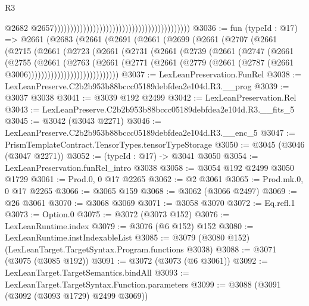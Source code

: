 \begin{lexlean}{R3}
\begin{coremodule}
                                                                                        @2682
                                                                                        @2657))))))))))))))))))))))))))))))))))))))))))
@3036 := fun (typeId : @17) =>
  @2661
    (@2683
      (@2661
        (@2691
          (@2661
            (@2699
              (@2661
                (@2707
                  (@2661
                    (@2715
                      (@2661
                        (@2723
                          (@2661
                            (@2731
                              (@2661
                                (@2739
                                  (@2661
                                    (@2747
                                      (@2661
                                        (@2755
                                          (@2661
                                            (@2763
                                              (@2661
                                                (@2771
                                                  (@2661
                                                    (@2779
                                                      (@2661
                                                        (@2787
                                                          (@2661 @3006))))))))))))))))))))))))))))
@3037 := LexLeanPreservation.FunRel
@3038 := LexLeanPreserve.C2b2b953b88bccc05189debfdea2e104d.R3.__prog
@3039 := @3037 @3038
@3041 := @3039 @192 @2499
@3042 := LexLeanPreservation.Rel
@3043 := LexLeanPreserve.C2b2b953b88bccc05189debfdea2e104d.R3.__fits_5
@3045 := @3042 (@3043 @2271)
@3046 := LexLeanPreserve.C2b2b953b88bccc05189debfdea2e104d.R3.__enc_5
@3047 := PrismTemplateContract.TensorTypes.tensorTypeStorage
@3050 := @3045 (@3046 (@3047 @2271))
@3052 := (typeId : @17) -> @3041 @3050
@3054 := LexLeanPreservation.funRel_intro @3038
@3058 := @3054 @192 @2499 @3050 @1729
@3061 := Prod.{0, 0} @17 @2265
@3062 := @2 @3061
@3065 := Prod.mk.{0, 0} @17 @2265
@3066 := @3065 @159
@3068 := @3062 (@3066 @2497)
@3069 := @26 @3061
@3070 := @3068 @3069
@3071 := @3058 @3070
@3072 := Eq.refl.{1}
@3073 := Option.{0}
@3075 := @3072 (@3073 @152)
@3076 := LexLeanRuntime.index
@3079 := @3076 (@6 @152) @152
@3080 := LexLeanRuntime.instIndexableList
@3085 := @3079 (@3080 @152) (LexLeanTarget.TargetSyntax.Program.functions @3038)
@3088 := @3071 (@3075 (@3085 @192))
@3091 := @3072 (@3073 (@6 @3061))
@3092 := LexLeanTarget.TargetSemantics.bindAll
@3093 := LexLeanTarget.TargetSyntax.Function.parameters
@3099 := @3088 (@3091 (@3092 (@3093 @1729) @2499 @3069))

\end{coremodule}
\end{lexlean}
